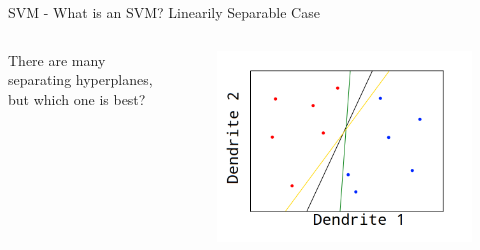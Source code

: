 \documentclass[10pt]{beamer}
\begin{document}
\begin{frame}[fragile]{SVM - What is an SVM? Linearily Separable Case}
\begin{columns}[T,onlytextwidth]
\begin{center}
\bigskip
\bigskip
\bigskip
\bigskip
\bigskip
There are many separating hyperplanes, but which one is best?
\end{center}
\begin{center}
\begin{figure}
      \includegraphics[height=0.9\textwidth]{svm_hyper.png}
	\end{figure}
	\end{center}
\end{columns}
\end{frame}
\end{document}
